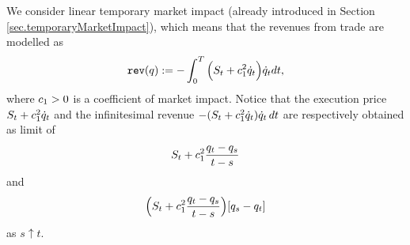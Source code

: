 \documentclass[10pt,a4paper]{article}
\begin{document}
We consider linear temporary market impact (already introduced in Section \ref{sec.temporaryMarketImpact}), which means that the revenues from trade are modelled as 
\begin{equation}\label{eq.revenuesFromTrade}
\mathtt{rev}(q) := -\int_{0}^{T} \Big(
S_t+ c_{1}^{2} \dot{q}_t
\Big)\dot{q}_t dt,
\end{equation}
where $c_{1}>0$ is a coefficient of market impact. Notice that the execution price $S_t + c_{1}^{2} \dot{q}_{t}$ and the infinitesimal revenue $-(
S_t+ c_{1}^{2} \dot{q}_t)\dot{q}_t \, dt $ are respectively obtained as limit of 
\[
S_t+ c_{1}^{2} \frac{q_t- q_s}{t-s}
\]
and
\[
\Big(
S_t+ c_{1}^{2} \frac{q_t- q_s}{t-s}
\Big)[q_s - q_t]
\]
as $s\uparrow t$.
\end{document}
